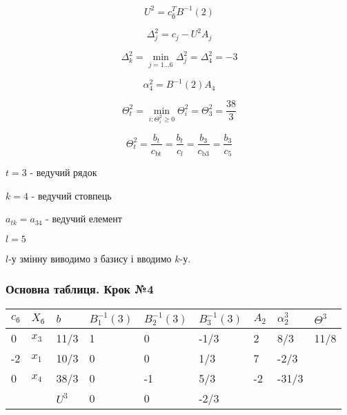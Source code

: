 \documentclass[a4paper, 12pt]{article}
\begin{document}
\begin{equation*}
	U^{2} = c_{\text{б}}^TB^{-1}(2)
\end{equation*}

\begin{equation*}
	\Delta_{j}^{2} = c_j - U^{2}A_{j}
\end{equation*}

\begin{equation*}
	\Delta_{k}^{2} = \min_{j=1 \dots 6} \Delta_{j}^{2} = \Delta_{4}^{2} = -3
\end{equation*}

\begin{equation*}
	\alpha_{4}^{2} = B^{-1}(2)A_{4}
\end{equation*}

\begin{equation*}
	\Theta_t^{2} = \min_{i: \Theta_i^{2} \geqslant 0} \Theta_i^{2} = \Theta_3^{2} = \frac{38}{3}
\end{equation*}

\begin{equation*}
	\Theta_t^{2} = \frac{b_t}{c_\text{bt}} = \frac{b_t}{c_l} = \frac{b_3}{c_\text{b3}} = \frac{b_3}{c_\text{5}}
\end{equation*}

$t = 3$ - ведучий рядок

$k = 4$ - ведучий стовпець

$a_{tk} = a_{34}$ - ведучий елемент

$l = 5$

$l$-у змінну виводимо з базису і вводимо $k$-у.

\subsubsection{Основна таблиця. Крок №4}

\begin{table}[H]
    \centering
    \begin{tabular}{|l|l|l|l|l|l|l|l|l|}
    \hline
         $c_\text{б}$ & $X_\text{б}$ & $b$ & $B_{1}^{-1}(3)$ & $B_{2}^{-1}(3)$ & $B_{3}^{-1}(3)$ & $A_{2}$ & $\alpha_{2}^{3}$  & $\Theta^{3}$ \\ \hline
        0 & $x_3$ & 11/3 & 1 & 0 & -1/3 & 2 & 8/3 & 11/8  \\ \hline
        -2 & $x_1$ & 10/3 & 0 & 0 & 1/3 & 7 & -2/3 & \\ \hline
        0 & $x_4$ & 38/3 & 0 & -1 & 5/3 & -2 & -31/3 & \\ \hline
        & & $U^{3}$ & 0 & 0 & -2/3 & & &  \\ \hline
    \end{tabular}
\end{table}
\end{document}

